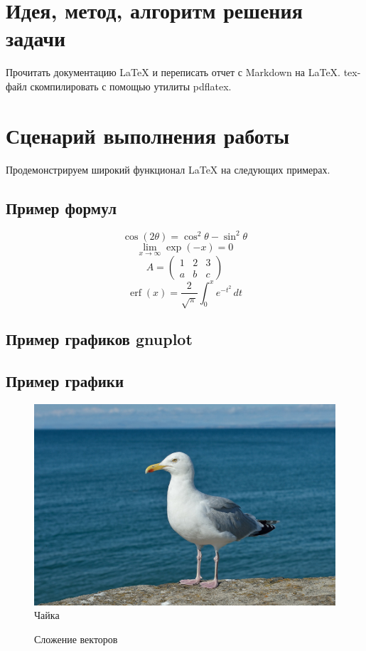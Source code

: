 \documentclass[12pt, letterpaper]{article}
\DeclareMathOperator\erf{erf}
\begin{document}
\section{Идея, метод, алгоритм решения задачи}
Прочитать документацию \LaTeX{} и переписать отчет с Markdown на \LaTeX{}. tex-файл скомпилировать с помощью утилиты pdflatex.
\section{Сценарий выполнения работы}
Продемонстрируем широкий функционал \LaTeX{} на следующих примерах.
\subsection{Пример формул}
\[\cos (2\theta) = \cos^2 \theta - \sin^2 \theta\]
\[\lim\limits_{x \to \infty} \exp(-x) = 0\]
\[A=
\begin{pmatrix}
1 & 2 & 3\\
a & b & c
\end{pmatrix}\]
\[
\erf(x)=\frac{2}{\sqrt{\pi}}\int_{0}^{x}e^{-t^{2}}\, dt
\]
\subsection{Пример графиков gnuplot}

\subsection{Пример графики}
\begin{figure}[h]
\includegraphics{gull}
\centering
\caption{Чайка}
\end{figure}
\begin{figure}[h]
\centering
\caption{Сложение векторов}
\end{figure}
\end{document}
